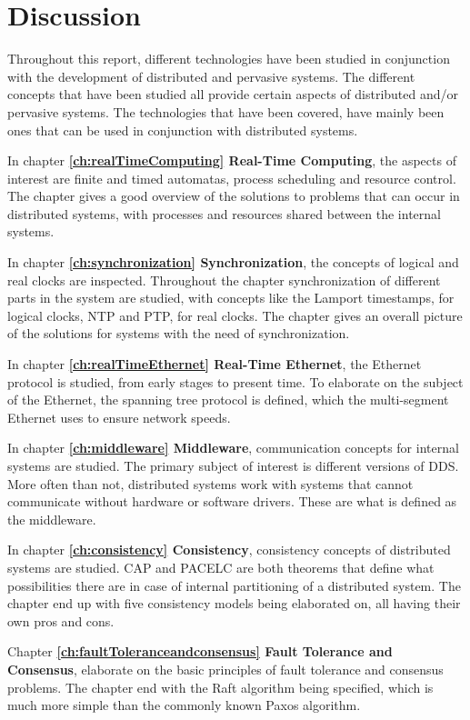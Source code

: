 \chapter{Discussion} \label{ch:discussion}

Throughout this report, different technologies have been studied in conjunction with the development of distributed and pervasive systems. The different concepts that have been studied all provide certain aspects of distributed and/or pervasive systems. The technologies that have been covered, have mainly been ones that can be used in conjunction with distributed systems.

In chapter \textbf{\ref{ch:realTimeComputing} Real-Time Computing}, the aspects of interest are finite and timed automatas, process scheduling and resource control. The chapter gives a good overview of the solutions to problems that can occur in distributed systems, with processes and resources shared between the internal systems.

In chapter \textbf{\ref{ch:synchronization} Synchronization}, the concepts of logical and real clocks are inspected. Throughout the chapter synchronization of different parts in the system are studied, with concepts like the Lamport timestamps, for logical clocks, NTP and PTP, for real clocks. The chapter gives an overall picture of the solutions for systems with the need of synchronization.

In chapter \textbf{\ref{ch:realTimeEthernet} Real-Time Ethernet}, the Ethernet protocol is studied, from early stages to present time. To elaborate on the subject of the Ethernet, the spanning tree protocol is defined, which the multi-segment Ethernet uses to ensure network speeds. 

In chapter \textbf{\ref{ch:middleware} Middleware}, communication concepts for internal systems are studied. The primary subject of interest is different versions of DDS. More often than not, distributed systems work with systems that cannot communicate without hardware or software drivers. These are what is defined as the middleware.

In chapter \textbf{\ref{ch:consistency} Consistency}, consistency concepts of distributed systems are studied. CAP and PACELC are both theorems that define what possibilities there are in case of internal partitioning of a distributed system. The chapter end up with five consistency models being elaborated on, all having their own pros and cons.

Chapter \textbf{\ref{ch:faultToleranceandconsensus} Fault Tolerance and Consensus}, elaborate on the basic principles of fault tolerance and consensus problems. The chapter end with the Raft algorithm being specified, which is much more simple than the commonly known Paxos algorithm.

